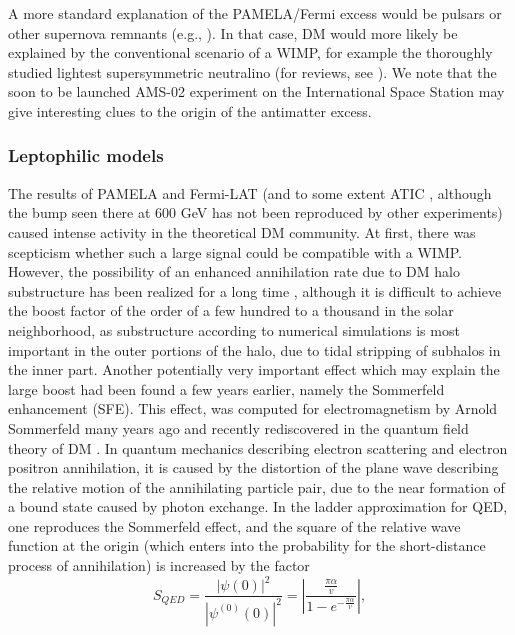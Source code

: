 \documentclass[10pt,aps,pra,reprint,amsmath,amsfonts,amssymb,showpacs,nofootinbib,floatfix]{revtex4-1}
\begin{document}
A more standard explanation of the PAMELA/Fermi excess would be
pulsars or other supernova remnants (e.g.,
\cite{1995PhRvD..52.3265A,Hooper:2008kg,Ahlers:2009ae}). In that case,
DM would more likely be explained by the conventional scenario of a WIMP,
for example the thoroughly studied lightest supersymmetric neutralino
(for reviews, see
\cite{Jungman:1995df,Bergstrom:2000pn,Bertone:2004pz}). We note that
the soon to be launched AMS-02 experiment on the International Space
Station \cite{ams02} may give interesting clues to the origin of the
antimatter excess.

\subsubsection{Leptophilic models}
\label{sect:LP}
The results of PAMELA \cite{Adriani:2008zr} and Fermi-LAT
\cite{Abdo:2009zk} (and to some extent ATIC
\cite{2008Natur.456..362C}, although the bump seen there at 600 GeV
has not been reproduced by other experiments) caused intense
activity in the theoretical DM community. At first, there was
scepticism whether such a large signal could be compatible with a
WIMP. However, the possibility of an enhanced annihilation rate due to
DM halo substructure has been realized for a long time
\cite{1993ApJ...411..439S,Bergstrom:1998zs,Moore:1999nt}, although it
is difficult to achieve the boost factor of the order of a few hundred
to a thousand in the solar neighborhood, as substructure according to
numerical simulations is most important in the outer portions of the
halo, due to tidal stripping of subhalos in the inner part. Another
potentially very important effect which may explain the large boost
had been found a few years earlier, namely the Sommerfeld enhancement
(SFE). This effect, was computed for electromagnetism by Arnold
Sommerfeld many years ago \cite{sommerfeld} and recently rediscovered
in the quantum field theory of DM
\cite{2005PhRvD..71f3528H,2007NuPhB.787..152C,2009PhRvD..79a5014A}.
In quantum mechanics describing electron scattering and electron
positron annihilation, it is caused by the distortion of the plane
wave describing the relative motion of the annihilating particle pair,
due to the near formation of a bound state caused by photon
exchange. In the ladder approximation for QED, one reproduces the
Sommerfeld effect, and the square of the relative wave function at the
origin (which enters into the probability for the short-distance
process of annihilation) is increased by the factor
\cite{2009PhRvD..79a5014A}
\begin{equation}
S_{QED}=\frac{|\psi(0)|^2}{|\psi^{(0)}(0)|^2}=
\left|\frac{\frac{\pi\alpha}{v}}{1-e^{-\frac{\pi\alpha}{v}}}\right|,
\end{equation}
\end{document}
